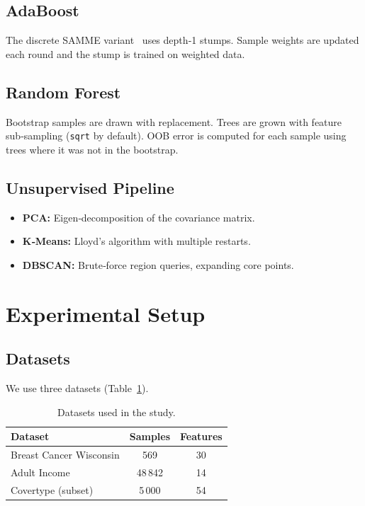 \documentclass[conference]{IEEEtran}
\begin{document}
\subsection{AdaBoost}
The discrete SAMME variant~\cite{hastie2009elements} uses
depth‑1 stumps.  Sample weights are updated each round and the
stump is trained on weighted data.

\subsection{Random Forest}
Bootstrap samples are drawn with replacement.  Trees are grown
with feature sub‑sampling (\texttt{sqrt} by default).  OOB error
is computed for each sample using trees where it was not in the
bootstrap.

\subsection{Unsupervised Pipeline}
\begin{itemize}
  \item \textbf{PCA:} Eigen‑decomposition of the covariance matrix.
  \item \textbf{K‑Means:} Lloyd’s algorithm with multiple restarts.
  \item \textbf{DBSCAN:} Brute‑force region queries, expanding
        core points.
\end{itemize}

\section{Experimental Setup}
\label{sec:experiments}
\subsection{Datasets}
We use three datasets (Table~\ref{tab:datasets}).
\begin{table}[h]
\centering
\caption{Datasets used in the study.}
\label{tab:datasets}
\begin{tabular}{lcc}
\toprule
\textbf{Dataset} & \textbf{Samples} & \textbf{Features}\\
\midrule
Breast Cancer Wisconsin & 569 & 30\\
Adult Income & 48\,842 & 14\\
Covertype (subset) & 5\,000 & 54\\
\bottomrule
\end{tabular}
\end{table}
\end{document}
